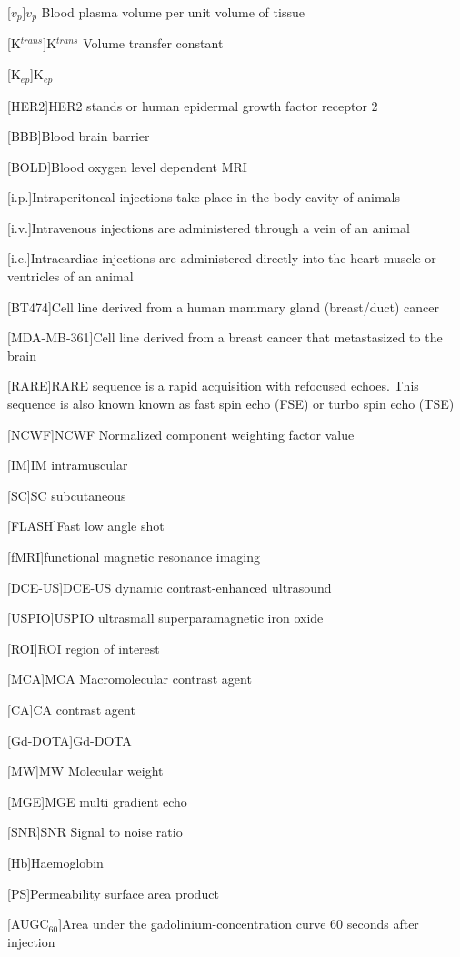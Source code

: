 \begin{acronym}
[$v_p$]{$v_p$ Blood plasma volume per unit volume of tissue}

[K$^{trans}$]{K$^{trans}$ Volume transfer constant}

[K$_{ep}$]{K$_{ep}$}

[HER2]{HER2 stands or human epidermal growth factor receptor 2}

[BBB]{Blood brain barrier}

[BOLD]{Blood oxygen level dependent MRI}

[i.p.]{Intraperitoneal injections take place in the body cavity of animals}

[i.v.]{Intravenous injections are administered through a vein of an animal}

[i.c.]{Intracardiac injections are administered directly into the heart muscle or ventricles of an animal}

[BT474]{Cell line derived from a human mammary gland (breast/duct) cancer}

[MDA-MB-361]{Cell line derived from a breast cancer that metastasized to the brain}

[RARE]{RARE sequence is a rapid acquisition with refocused echoes. This sequence is also known known as fast spin echo (FSE) or turbo spin echo (TSE)}

[NCWF]{NCWF Normalized component weighting factor value}

[IM]{IM intramuscular}

[SC]{SC subcutaneous}

[FLASH]{Fast low angle shot}

[fMRI]{functional magnetic resonance imaging}

[DCE-US]{DCE-US dynamic contrast-enhanced ultrasound}

[USPIO]{USPIO ultrasmall superparamagnetic iron oxide}

[ROI]{ROI region of interest}

[MCA]{MCA Macromolecular contrast agent}

[CA]{CA contrast agent}

[Gd-DOTA]{Gd-DOTA}

[MW]{MW Molecular weight}

[MGE]{MGE multi gradient echo}

[SNR]{SNR Signal to noise ratio}

[Hb]{Haemoglobin}

[PS]{Permeability surface area product}

[AUGC$_{60}$]{Area under the gadolinium-concentration curve 60 seconds after injection}

\end{acronym}

